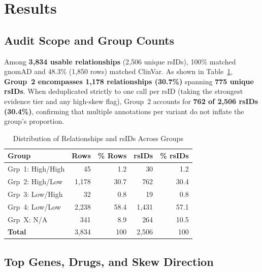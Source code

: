 \documentclass[conference]{IEEEtran}
\begin{document}
\section{Results}

\subsection{Audit Scope and Group Counts}

Among \textbf{3,834 usable relationships} (2,506 unique rsIDs), 100\% matched gnomAD and 48.3\% (1,850 rows) matched ClinVar.
As shown in Table~\ref{tab:group-counts}, \textbf{Group~2 encompasses 1,178 relationships (30.7\%)} spanning \textbf{775 unique rsIDs}.
When deduplicated strictly to one call per rsID (taking the strongest evidence tier and any high-skew flag), Group~2 accounts for \textbf{762 of 2,506 rsIDs (30.4\%)}, confirming that multiple annotations per variant do not inflate the group's proportion.

\begin{table}[!t]
\centering
\caption{Distribution of Relationships and rsIDs Across Groups}
\label{tab:group-counts}
\renewcommand{\arraystretch}{1.15}
\begin{tabular}{|l|r|r|r|r|}
\hline
\textbf{Group} & \textbf{Rows} & \textbf{\% Rows} & \textbf{rsIDs} & \textbf{\% rsIDs} \\
\hline
\textcolor{group1}{Grp~1: High/High}  &     45 &  1.2 &    30 &  1.2 \\
\hline
\textcolor{group2}{Grp~2: High/Low}   &  1,178 & 30.7 &   762 & 30.4 \\
\hline
\textcolor{group3}{Grp~3: Low/High}   &     32 &  0.8 &    19 &  0.8 \\
\hline
\textcolor{group4}{Grp~4: Low/Low}    &  2,238 & 58.4 & 1,431 & 57.1 \\
\hline
\textcolor{groupX}{Grp~X: N/A}        &    341 &  8.9 &   264 & 10.5 \\
\hline
\textbf{Total}                         &  3,834 & 100  & 2,506 & 100  \\
\hline
\end{tabular}
\end{table}

\subsection{Top Genes, Drugs, and Skew Direction}
\end{document}
